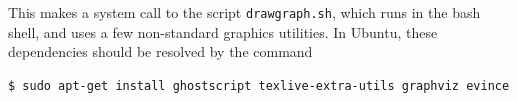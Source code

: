 \documentclass[a4paper,10pt]{article}
\begin{document}
\FloatBarrier
\noindent This makes a system call to the script \texttt{drawgraph.sh}, which runs in the bash shell,
and uses a few non-standard graphics utilities.  In Ubuntu, these dependencies should be 
resolved by the command
\begin{verbatim}
$ sudo apt-get install ghostscript texlive-extra-utils graphviz evince
\end{verbatim}
\end{document}
